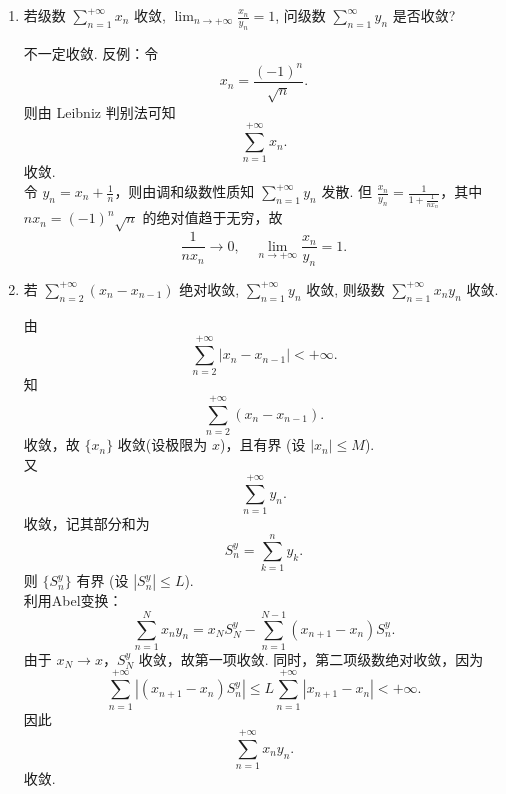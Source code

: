 \begin{enumerate}
    \item[3.]若级数 \(\displaystyle\sum_{n=1}^{+\infty} x_{n}\) 收敛, \(\displaystyle\lim_{n \to +\infty} \frac{x_{n}}{y_{n}} = 1\), 
    问级数 \(\displaystyle\sum_{n=1}^{\infty} y_{n}\) 是否收敛?
    \begin{solution}
        不一定收敛. 反例：令
        \[x_n = \frac{(-1)^n}{\sqrt{n}}.\]
        则由 Leibniz 判别法可知 
        \[
        \sum_{n=1}^{+\infty} x_n.
        \] 收敛.\\
        令 $\displaystyle y_n = x_n + \frac{1}{n}$，则由调和级数性质知
        $\displaystyle \sum_{n=1}^{+\infty} y_n$ 发散.
        但
        $\displaystyle \frac{x_n}{y_n} = \frac{1}{1 + \frac{1}{n x_n}}$，其中 $\displaystyle n x_n = (-1)^n \sqrt{n}$
        的绝对值趋于无穷，故\[\displaystyle 
        \frac{1}{n x_n} \to 0, \quad \lim_{n\to+\infty} \frac{x_n}{y_n} = 1.\]
    \end{solution}

    \item[4.]若 \(\displaystyle\sum_{n=2}^{+\infty} (x_{n} - x_{n-1})\) 绝对收敛, \(\displaystyle\sum_{n=1}^{+\infty} y_{n}\) 收敛, 
    则级数 \(\displaystyle\sum_{n=1}^{+\infty} x_{n} y_{n}\) 收敛.
    \begin{solution}
        由
        \[
        \sum_{n=2}^{+\infty} |x_n - x_{n-1}| < +\infty.
        \]
        知
        \[
        \sum_{n=2}^{+\infty} (x_n - x_{n-1}).
        \]
        收敛，故 $\{x_n\}$ 收敛(设极限为 $x$)，且有界 (设 $|x_n| \leq M$).\\
        又
        \[
        \sum_{n=1}^{+\infty} y_n.
        \] 
        收敛，记其部分和为 
        \[
        S_n^y = \sum_{k=1}^n y_k.
        \]
        则 $\{S_n^y\}$ 有界 (设 $|S_n^y| \leq L$).\\
        利用Abel变换：
        \[
        \sum_{n=1}^N x_n y_n = x_N S_N^y - \sum_{n=1}^{N-1} (x_{n+1} - x_n) S_n^y.
        \]
        由于 $x_N \to x$，$S_N^y$ 收敛，故第一项收敛. 同时，第二项级数绝对收敛，因为
        \[
        \sum_{n=1}^{+\infty} |(x_{n+1} - x_n) S_n^y| \leq L \sum_{n=1}^{+\infty} |x_{n+1} - x_n| < +\infty.
        \]
        因此 
        \[
        \sum_{n=1}^{+\infty} x_n y_n.
        \] 收敛.
    \end{solution}


\end{enumerate}
